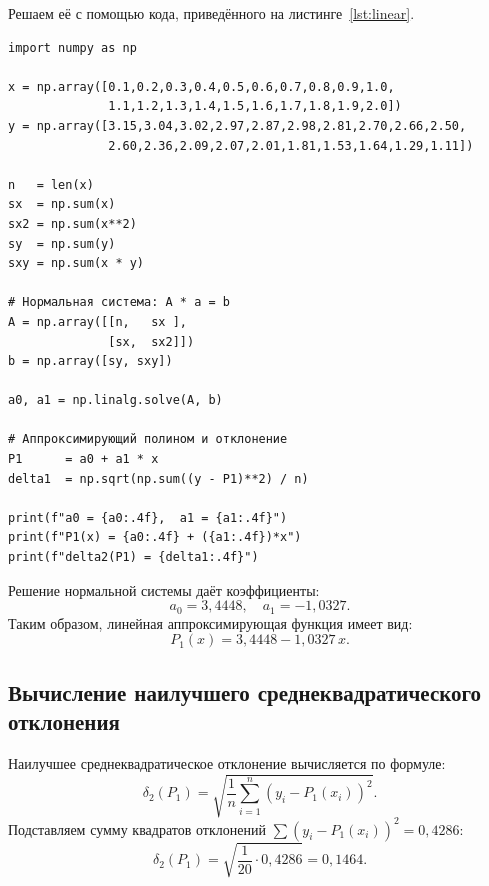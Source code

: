Решаем её с помощью кода, приведённого на листинге~\ref{lst:linear}.

\begin{lstlisting}[caption={Линейная аппроксимация МНК}, label=lst:linear]
import numpy as np

x = np.array([0.1,0.2,0.3,0.4,0.5,0.6,0.7,0.8,0.9,1.0,
              1.1,1.2,1.3,1.4,1.5,1.6,1.7,1.8,1.9,2.0])
y = np.array([3.15,3.04,3.02,2.97,2.87,2.98,2.81,2.70,2.66,2.50,
              2.60,2.36,2.09,2.07,2.01,1.81,1.53,1.64,1.29,1.11])

n   = len(x)
sx  = np.sum(x)
sx2 = np.sum(x**2)
sy  = np.sum(y)
sxy = np.sum(x * y)

# Нормальная система: A * a = b
A = np.array([[n,   sx ],
              [sx,  sx2]])
b = np.array([sy, sxy])

a0, a1 = np.linalg.solve(A, b)

# Аппроксимирующий полином и отклонение
P1      = a0 + a1 * x
delta1  = np.sqrt(np.sum((y - P1)**2) / n)

print(f"a0 = {a0:.4f},  a1 = {a1:.4f}")
print(f"P1(x) = {a0:.4f} + ({a1:.4f})*x")
print(f"delta2(P1) = {delta1:.4f}")
\end{lstlisting}

Решение нормальной системы даёт коэффициенты:
\[
a_0 = 3{,}4448, \quad a_1 = -1{,}0327.
\]
Таким образом, линейная аппроксимирующая функция имеет вид:
\[
P_1(x) = 3{,}4448 - 1{,}0327\,x.
\]

\subsection{Вычисление наилучшего среднеквадратического отклонения}

Наилучшее среднеквадратическое отклонение вычисляется по формуле:
\[
\delta_2(P_1) = \sqrt{\frac{1}{n}\sum_{i=1}^{n}(y_i - P_1(x_i))^2}.
\]
Подставляем сумму квадратов отклонений $\sum(y_i - P_1(x_i))^2 = 0{,}4286$:
\[
\delta_2(P_1) = \sqrt{\frac{1}{20} \cdot 0{,}4286} = 0{,}1464.
\]